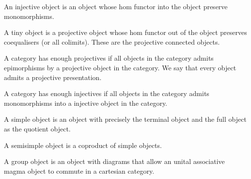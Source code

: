 \begin{definition}
    \label{definition-injective-object}
    An injective object is an object whose hom functor into the object preserve monomorphisms.
\end{definition}

\begin{definition}
    \label{definition-tiny-object}
    A tiny object is a projective object whose hom functor out of the object preserves coequalisers (or all colimits). These are the projective connected objects.
\end{definition}

\begin{definition}
    \label{definition-enough-projectives}
    A category has enough projectives if all objects in the category admits epimorphisms by a projective object in the category. We say that every object admits a projective presentation.
\end{definition}

\begin{definition}
    \label{definition-enough-injectives}
    A category has enough injectives if all objects in the category admits monomorphisms into a injective object in the category.
\end{definition}

\begin{definition}
    \label{definition-simple-object}
    A simple object is an object with precisely the terminal object and the full object as the quotient object.
\end{definition}

\begin{definition}
    \label{definition-semisimple-object}
    A semisimple object is a coproduct of simple objects.
\end{definition}

\begin{definition}
    \label{definition-group-object}
    A group object is an object with diagrams that allow an unital associative magma object to commute in a cartesian category.
\end{definition}

